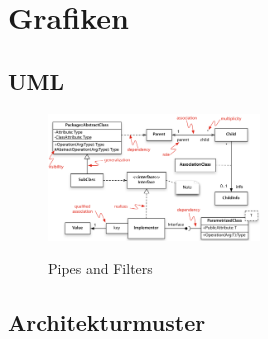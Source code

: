 {\let\clearpage\relax \chapter{Grafiken}}
\section{UML}

\begin{figure}[h]
	\begin{center}
		\includegraphics[width=0.5\textwidth]{images/uml}
		\label{fig:pipes_filters}
		\caption{Pipes and Filters}
	\end{center}
\end{figure}

\section{Architekturmuster}


